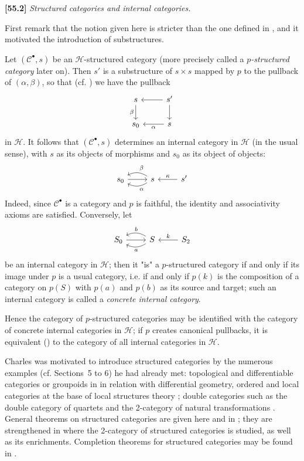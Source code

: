 \documentclass[a4paper,fleqn]{article}
\theoremstyle{plain}
\theoremstyle{definition}
\newenvironment{longcomm}[1]
  {\noindent\textbf{[#1]}\rmfamily}
  {}
\newcommand{\CC}{\mathcal{C}}
\newcommand{\HH}{\mathcal{H}}
\begin{document}
\begin{longcomm}{55.2}
  \emph{Structured categories and internal categories.}

  First remark that the notion given here is stricter than the one defined in \cite{coll57}, and it motivated the introduction of substructures.

  Let $(\CC^\bullet,s)$ be an $\HH$-structured category (more precisely called a \emph{$p$-structured category} later on).
  Then $s'$ is a substructure of $s\times s$ mapped by $p$ to the pullback of $(\alpha,\beta)$, so that (cf. \cite[Proposition~2.1]{coll109}) we have the pullback
  \[
    \begin{tikzcd}
      s \ar[d,swap,"\beta"]
      & s' \ar[l] \ar[d]
    \\s_0
      & s \ar[l,"\alpha"]
    \end{tikzcd}
  \]
  in $\HH$.
  It follows that $(\CC^\bullet,s)$ determines an internal category in $\HH$ (in the usual sense), with $s$ as its objects of morphisms and $s_0$ as its object of objects:
  \[
    \begin{tikzcd}
      s_0 \ar[r]
      & s \ar[l,bend left=30,"\alpha"] \ar[l,bend right=30,swap,"\beta"]
      & s' \ar[l,swap,"\kappa"]
    \end{tikzcd}
  \]
  Indeed, since $\CC^\bullet$ is a category and $p$ is faithful, the identity and associativity axioms are satisfied.
  Conversely, let
  \[
    \begin{tikzcd}
      S_0 \ar[r]
      & S \ar[l,bend left=30,"a"] \ar[l,bend right=30,swap,"b"]
      & S_2 \ar[l,swap,"k"]
    \end{tikzcd}
  \]
  be an internal category in $\HH$;
  then it "is" a $p$-structured category if and only if its image under $p$ is a usual category, i.e. if and only if $p(k)$ is the composition of a category on $p(S)$ with $p(a)$ and $p(b)$ as its source and target;
  such an internal category is called a \emph{concrete internal category}.

  Hence the category of $p$-structured categories may be identified with the category of concrete internal categories in $\HH$;
  if $p$ creates canonical pullbacks, it is equivalent (\cite{coll104}) to the category of all internal categories in $\HH$.

  Charles was motivated to introduce structured categories by the numerous examples (cf. Sections~5 to 6) he had already met: topological and differentiable categories or groupoids in \cite{coll28,coll50} in relation with differential geometry, ordered and local categories at the base of local structures theory \cite{coll47,coll53,coll55};
  double categories such as the double category of quartets \cite{coll55} and the 2-category of natural transformations \cite{coll52}.
  General theorems on structured categories are given here and in \cite{coll66,coll100};
  they are strengthened in \cite{coll109} where the 2-category of structured categories is studied, as well as its enrichments.
  Completion theorems for structured categories may be found in \cite{coll102}.


\end{longcomm}
\end{document}
